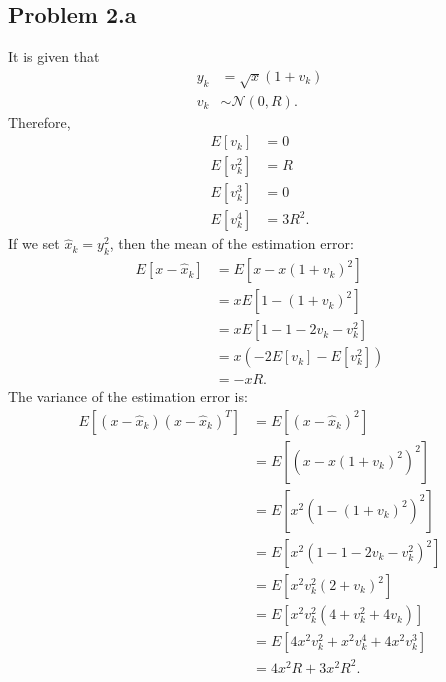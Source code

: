 \subsection*{Problem 2.a}
It is given that
\begin{align*}
	y_k &= \sqrt{x}(1+v_k)\\
	v_k &\sim \mathcal{N}(0, R).
\end{align*}
Therefore,
\begin{align*}
	E[v_k] &= 0\\
	E[v_k^2] &= R\\
	E[v_k^3] &= 0\\
	E[v_k^4] &= 3R^2.
\end{align*}
If we set $\hat{x}_k = y_k^2$, then the mean of the estimation error:
\begin{align*}
	E[x-\hat{x}_k] &= E[x-x(1+v_k)^2]\\
	&= xE[1-(1+v_k)^2]\\
	&= xE[1-1-2v_k-v_k^2]\\
	&= x(-2E[v_k]-E[v_k^2])\\
	&= -xR.
\end{align*}
The variance of the estimation error is:
\begin{align*}
	E[(x-\hat{x}_k)(x-\hat{x}_k)^T] &= E[(x-\hat{x}_k)^2]\\
	&= E[(x-x(1+v_k)^2)^2]\\
	&= E[x^2(1-(1+v_k)^2)^2]\\
	&= E[x^2(1-1-2v_k-v_k^2)^2]\\
	&= E[x^2v_k^2(2+v_k)^2]\\
	&= E[x^2v_k^2(4+v_k^2+4v_k)]\\
	&= E[4x^2v_k^2+x^2v_k^4+4x^2v_k^3]\\
	&= 4x^2R+3x^2R^2.
\end{align*}
